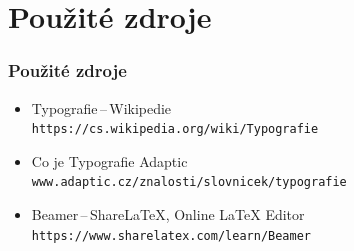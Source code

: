 \documentclass{beamer}
\begin{document}
\section{Použité zdroje}
\begin{frame}\frametitle{Použité zdroje}
\begin{itemize}
\item Typografie\,--\,Wikipedie\\
\texttt{https://cs.wikipedia.org/wiki/Typografie}
\item Co je Typografie\,\textpipe\,Adaptic\\
\texttt{www.adaptic.cz/znalosti/slovnicek/typografie}
\item Beamer\,--\,ShareLaTeX, Online LaTeX Editor\\
\texttt{https://www.sharelatex.com/learn/Beamer} 
\end{itemize}
\end{frame}
\end{document}

